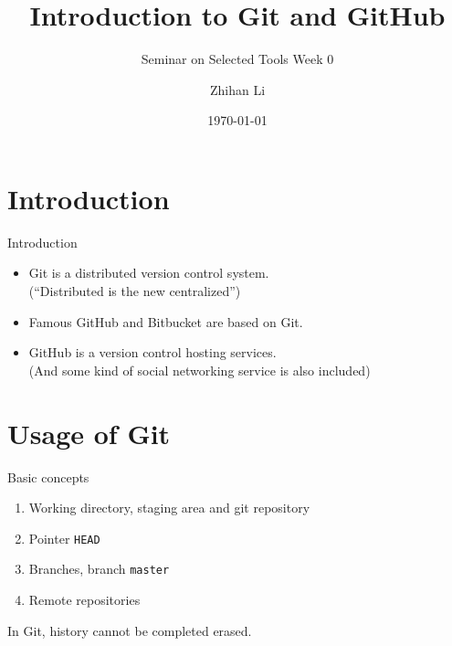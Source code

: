 \documentclass[english, nochinese]{pkuslide}
\title{Introduction to Git and GitHub}
\subtitle{Seminar on Selected Tools Week 0}
\author{Zhihan Li}
\date{\today}
\begin{document}
\begin{frame}
\titlepage
\end{frame}

\begin{frame}
\tableofcontents[subsectionstyle=show]
\end{frame}

\section{Introduction}

\begin{frame}
\sectionpage
\end{frame}

\begin{frame}{Introduction}
\begin{itemize}
\item Git is a distributed version control system. \\
(``Distributed is the new centralized'')
\item Famous GitHub and Bitbucket are based on Git.
\item GitHub is a version control hosting services. \\
(And some kind of social networking service is also included)
\end{itemize}
\end{frame}

\section{Usage of Git}

\begin{frame}
\sectionpage
\end{frame}

\begin{frame}[fragile]{Basic concepts}
\begin{enumerate}
\item Working directory, staging area and git repository
\item Pointer \verb"HEAD"
\item Branches, branch \verb"master"
\item Remote repositories
\end{enumerate}
In Git, history \alert{cannot} be completed erased.
\end{frame}
\end{document}

